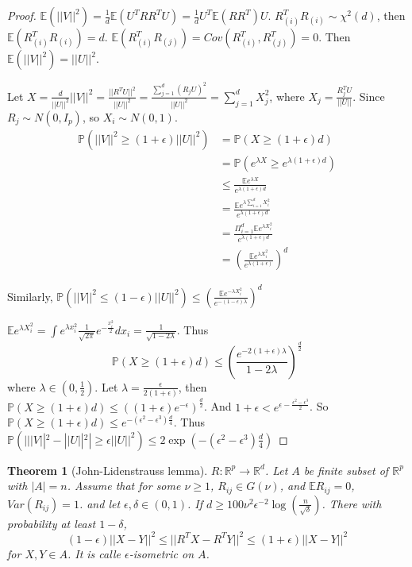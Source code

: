 \documentclass[11pt]{article}
\def\BP{{\bf P}}
\def\BR{{\mathbb R}}
\def\BE{{\mathbb E}}
\def\BP{{\mathbb P}}
\newtheorem{theorem}{Theorem}[section]
\begin{document}
\begin{proof}
$\BE (||V||^2) = \frac{1}{d} \BE (U^T RR^T U) = \frac{1}{d} U^T\BE(RR^T)U$.
$R_{(i)}^TR_{(i)} \sim \chi^2(d)$, then $\BE(R_{(i)}^TR_{(i)}) = d$. $\BE(R_{(i)}^T R_{(j)}) = Cov(R_{(i)}^T, R_{(j)}^T) = 0$. Then $\BE (||V||^2) = ||U||^2$.

Let $X = \frac{d}{||U||^2} ||V||^2 = \frac{||R^TU||^2}{||U||^2} = \frac{\sum_{j=1}^{d} (R_j U)^2}{||U||^2} = \sum_{j=1}^{d} X_j^2$, where $X_j = \frac{R_j^T U}{||U||}$. Since $R_j \sim N(0, I_p)$, so $X_i \sim N(0,1)$.
\[\begin{split}
	\BP(||V||^2 \geq (1 + \epsilon) ||U||^2) & = \BP(X \geq (1+\epsilon) d) \\
	&= \BP(e^{\lambda X} \geq e^{\lambda(1+\epsilon)d}) \\
	&\leq \frac{\BE e^{\lambda X}}{e^{\lambda(1+\epsilon)d}} \\
	&= \frac{\BE e^{\lambda \sum_{i=1}^{d}X_i^2}}{e^{\lambda(1+\epsilon)d}} \\
	&= \frac{\Pi_{i=1}^d \BE e^{\lambda X_i^2}}{e^{\lambda (1+\epsilon) d}} \\
	&= \left( \frac{\BE e^{\lambda X_i^2}}{e^{\lambda (1+\epsilon)}} \right)^d
\end{split}\]

Similarly, $\BP(||V||^2 \leq (1-\epsilon)||U||^2 ) \leq \left( \frac{\BE e^{-\lambda X_i^2}}{e^{-(1-\epsilon)\lambda}} \right)^d$

$\BE e^{\lambda X_i^2} = \int e^{\lambda x_i^2} \frac{1}{\sqrt{2\pi}} e^{-\frac{x_i^2}{2}} dx_i = \frac{1}{\sqrt{1 - 2\lambda}}$. Thus
\[
	\BP(X \geq (1+\epsilon) d) \leq \left( \frac{e^{-2(1+\epsilon)\lambda}}{1-2\lambda} \right)^{\frac{d}{2}}
\]
where $\lambda \in (0, \frac{1}{2})$. Let $\lambda = \frac{\epsilon}{2(1+\epsilon)}$, then $\BP(X \geq (1+\epsilon)d) \leq ((1+\epsilon)e^{-\epsilon})^{\frac{d}{2}}$. And $1+\epsilon < e^{\epsilon - \frac{\epsilon^2 - \epsilon^3}{2}}$. So $\BP(X \geq (1 + \epsilon)d ) \leq e^{-(\epsilon^2 -\epsilon^3)\frac{d}{4}}$.
Thus $\BP( | ||V||^2 - ||U||^2 | \geq \epsilon ||U||^2 ) \leq 2 \exp(-(\epsilon^2 - \epsilon^3)\frac{d}{4})$
	
\end{proof}

\begin{theorem}[John-Lidenstrauss lemma]
$R: \BR^p \to \BR^d$. Let $A$ be finite subset of $\BR^p$ with $|A| = n$. Assume that for some $\nu \geq 1$, $R_{ij} \in G(\nu)$, and $\BE R_{ij} = 0$, $Var(R_{ij}) = 1$. and let $\epsilon, \delta \in (0, 1)$. If $d \geq 100\nu^2 \epsilon^{-2} \log(\frac{n}{\sqrt{\delta}})$. There with probability at least $1-\delta$, 
\[
	(1-\epsilon)||X - Y||^2 \leq ||R^T X - R^T Y||^2 \leq  (1+\epsilon)||X - Y||^2
\]
for $X, Y \in A$. It is calle $\epsilon$-isometric on $A$.
\end{theorem}
\end{document}
